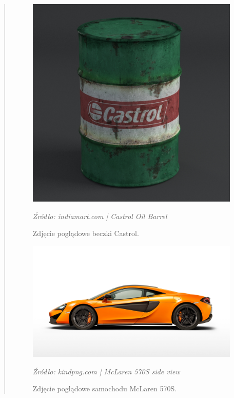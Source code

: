 \begin{quotation}
\begin{figure}[!hbt]
\centering
  \includegraphics[width=1\linewidth]{barrelref.jpg}
  \caption{Zdjęcie poglądowe beczki Castrol.}\label{rys_2}
  \begin{minipage}[t]{0.75\linewidth}
    \emph{Źródło: indiamart.com | Castrol Oil Barrel}
  \end{minipage}
\end{figure}



\begin{figure}[!hbt]
\centering
  \includegraphics[width=1\linewidth]{carref.jpg}
  \caption{Zdjęcie poglądowe samochodu McLaren 570S.}\label{rys_3}
  \begin{minipage}[t]{0.75\linewidth}
    \emph{Źródło: kindpng.com | McLaren 570S side view}
  \end{minipage}
\end{figure}




\end{quotation}
